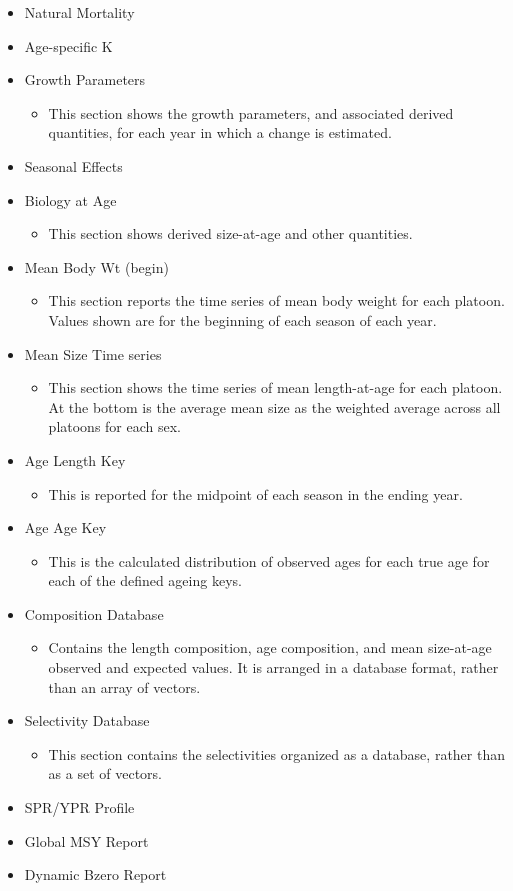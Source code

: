 \begin{itemize}
	\item Natural Mortality
	\item Age-specific K
	\item Growth Parameters
	\begin{itemize}
		\item This section shows the growth parameters, and associated derived quantities, for each year in which a change is estimated.
	\end{itemize}
	\item Seasonal Effects
	\item Biology at Age
	\begin{itemize}
		\item This section shows derived size-at-age and other quantities.
	\end{itemize}
	\item Mean Body Wt (begin)
	\begin{itemize}
		\item This section reports the time series of mean body weight for each platoon. Values shown are for the beginning of each season of each year.
	\end{itemize}
	\item Mean Size Time series
	\begin{itemize}
		\item This section shows the time series of mean length-at-age for each platoon. At the bottom is the average mean size as the weighted average across all platoons for each sex.
	\end{itemize}
	\item Age Length Key
	\begin{itemize}
		\item This is reported for the midpoint of each season in the ending year.
	\end{itemize}
	\item Age Age Key
	\begin{itemize}
		\item This is the calculated distribution of observed ages for each true age for each of the defined ageing keys.
	\end{itemize}
	\item Composition Database
	\begin{itemize}
		\item Contains the length composition, age composition, and mean size-at-age observed and expected values.  It is arranged in a database format, rather than an array of vectors.
	\end{itemize}
	\item Selectivity Database
	\begin{itemize}
		\item This section contains the selectivities organized as a database, rather than as a set of vectors.
	\end{itemize}
	\item SPR/YPR Profile
	\item Global MSY Report
	\item Dynamic Bzero Report
\end{itemize}

\pagebreak
